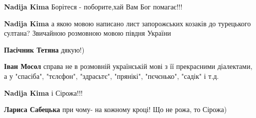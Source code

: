 \begin{itemize}
\begin{itemize}
 
\textbf{Nadija Kima} Борітеся - поборите,хай Вам Бог помагає!!!

 
\textbf{Nadija Kima} а якою мовою написано лист запорожських козаків до турецького султана? Звичайною розмовною мовою півдня України

 
\textbf{Пасічник Тетяна} дякую!)

 
\textbf{Іван Мосол} справа не в розмовній українській мові з її прекрасними діалектами, а у "спасіба", "тєлєфон", "здрасьтє", "прянікі", "пєчєнько", "садік" і т.д.

 
\textbf{Nadija Kima} і Сірожа!!!

 
\textbf{Лариса Сабецька} при чому- на кожному кроці! Що не рожа, то Сірожа)


\end{itemize}
\end{itemize}
